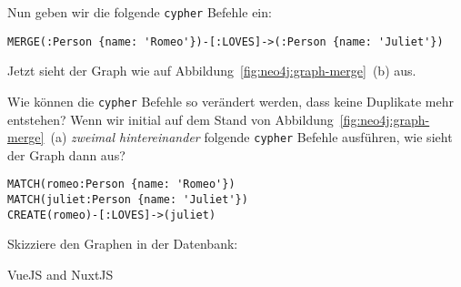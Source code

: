 \documentclass[
addpoints,a4paper,ngerman,answers
]{exam}
\begin{document}
\begin{questions}
\begin{parts}
  \newpage
  Nun geben wir die folgende \texttt{cypher} Befehle ein:
  \begin{lstlisting}
MERGE(:Person {name: 'Romeo'})-[:LOVES]->(:Person {name: 'Juliet'})
  \end{lstlisting}


  Jetzt sieht der Graph wie auf Abbildung~\ref{fig:neo4j:graph-merge}~(b) aus.
  \begin{subparts}
    \subpart[1]
    Wie können die \texttt{cypher} Befehle so verändert werden, dass keine
    Duplikate mehr entstehen?
    \makeemptybox{14em}
    \subpart[2]
    Wenn wir initial auf dem Stand von Abbildung~\ref{fig:neo4j:graph-merge}~(a)
    \emph{zweimal hintereinander} folgende \texttt{cypher} Befehle ausführen,
    wie sieht der Graph dann aus?
    \begin{lstlisting}
MATCH(romeo:Person {name: 'Romeo'})
MATCH(juliet:Person {name: 'Juliet'})
CREATE(romeo)-[:LOVES]->(juliet)
    \end{lstlisting}
    Skizziere den Graphen in der Datenbank:
    \makeemptybox{14em}
  \end{subparts}
\end{parts}

\clearpage

\question VueJS and NuxtJS
\end{questions}
\end{document}
